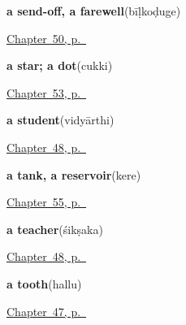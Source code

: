 \noindent\begin{minipage}[t]{\linewidth}
\raggedright
\textbf{a send-off, a farewell}\enspace\emph{}\enspace(bīḷkoḍuge)\par
\footnotesize \hyperref[ch:ka-leave-more]{Chapter~50, p.~\pageref*{ch:ka-leave-more}}
\end{minipage}\par\smallskip

\noindent\begin{minipage}[t]{\linewidth}
\raggedright
\textbf{a star; a dot}\enspace\emph{}\enspace(cukki)\par
\footnotesize \hyperref[ch:ka-sky]{Chapter~53, p.~\pageref*{ch:ka-sky}}
\end{minipage}\par\smallskip

\noindent\begin{minipage}[t]{\linewidth}
\raggedright
\textbf{a student}\enspace\emph{}\enspace(vidyārthi)\par
\footnotesize \hyperref[ch:ka-roles]{Chapter~48, p.~\pageref*{ch:ka-roles}}
\end{minipage}\par\smallskip

\noindent\begin{minipage}[t]{\linewidth}
\raggedright
\textbf{a tank, a reservoir}\enspace\emph{}\enspace(kere)\par
\footnotesize \hyperref[ch:ka-river-road]{Chapter~55, p.~\pageref*{ch:ka-river-road}}
\end{minipage}\par\smallskip

\noindent\begin{minipage}[t]{\linewidth}
\raggedright
\textbf{a teacher}\enspace\emph{}\enspace(śikṣaka)\par
\footnotesize \hyperref[ch:ka-roles]{Chapter~48, p.~\pageref*{ch:ka-roles}}
\end{minipage}\par\smallskip

\noindent\begin{minipage}[t]{\linewidth}
\raggedright
\textbf{a tooth}\enspace\emph{}\enspace(hallu)\par
\footnotesize \hyperref[ch:ka-body-more]{Chapter~47, p.~\pageref*{ch:ka-body-more}}
\end{minipage}\par\smallskip

